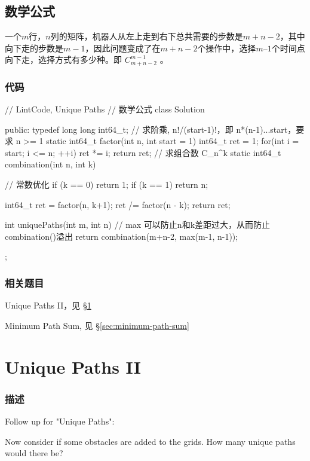 \subsection{数学公式}
一个$m$行，$n$列的矩阵，机器人从左上走到右下总共需要的步数是$m+n-2$，其中向下走的步数是$m-1$，因此问题变成了在$m+n-2$个操作中，选择$m–1$个时间点向下走，选择方式有多少种。即 $C_{m+n-2}^{m-1}$ 。

\subsubsection{代码}
\begin{Code}
// LintCode, Unique Paths
// 数学公式
class Solution {
public:
    typedef long long int64_t;
    // 求阶乘, n!/(start-1)!，即 n*(n-1)...start，要求 n >= 1
    static int64_t factor(int n, int start = 1) {
        int64_t  ret = 1;
        for(int i = start; i <= n; ++i)
            ret *= i;
        return ret;
    }
    // 求组合数 C_n^k
    static int64_t combination(int n, int k) {
        // 常数优化
        if (k == 0) return 1;
        if (k == 1) return n;

        int64_t ret = factor(n, k+1);
        ret /= factor(n - k);
        return ret;
    }

    int uniquePaths(int m, int n) {
        // max 可以防止n和k差距过大，从而防止combination()溢出
        return combination(m+n-2, max(m-1, n-1));
    }
};
\end{Code}


\subsubsection{相关题目}
\begindot
\item Unique Paths II，见 \S \ref{sec:unique-paths-ii}
\item Minimum Path Sum, 见 \S \ref{sec:minimum-path-sum}
\myenddot


\section{Unique Paths II} %
\label{sec:unique-paths-ii}


\subsubsection{描述}
Follow up for "Unique Paths":

Now consider if some obstacles are added to the grids. How many unique paths would there be?

